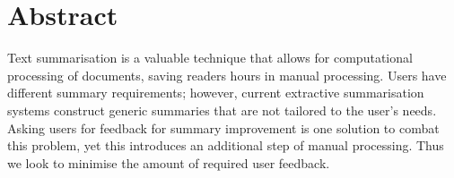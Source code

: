 \documentclass[ %
                    author={James Stephenson},
                supervisor={Dr. Edwin Simpson},
                    degree={MSc},
                     title={Project Plan: Bayesian Deep Learning For Extractive Test Summarisation},
                  subtitle={},
                      type={},
                      year={2022}]{../additions/dissertation}
\begin{document}
	
	
	
	
	
	\maketitle
	
	
	\frontmatter
	
	
	\tableofcontents
	
	
	
	\chapter*{Abstract}		

		Text summarisation is a valuable technique that allows for computational processing of documents, saving readers hours in manual processing. Users have different summary requirements; however, current extractive summarisation systems construct generic summaries that are not tailored to the user's needs. Asking users for feedback for summary improvement is one solution to combat this problem, yet this introduces an additional step of manual processing. Thus we look to minimise the amount of required user feedback.
		
\end{document}
